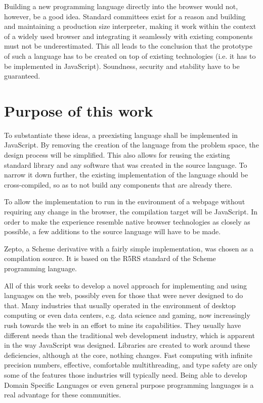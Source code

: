 \documentclass[oneside,11pt,xetex]{scrbook}
\begin{document}
Building a new programming language directly into the browser would not, however, be a good idea. Standard committees exist for a reason and building and maintaining a production size interpreter, making it work within the context of a widely used browser and integrating it seamlessly with existing components must not be underestimated. This all leads to the conclusion that the prototype of such a language has to be created on top of existing technologies (i.e. it has to be implemented in JavaScript). Soundness, security and stability have to be guaranteed.

\clearpage

\section*{Purpose of this work}
To substantiate these ideas, a preexisting language shall be implemented in JavaScript. By removing the creation of the language from the problem space, the design process will be simplified. This also allows for reusing the existing standard library and any software that was created in the source language. To narrow it down further, the existing implementation of the language should be cross-compiled, so as to not build any components that are already there.

To allow the implementation to run in the environment of a webpage without requiring any change in the browser, the compilation target will be JavaScript. In order to make the experience resemble native browser technologies as closely as possible, a few additions to the source language will have to be made.

Zepto, a Scheme derivative with a fairly simple implementation, was chosen as a compilation source. It is based on the R5RS standard of the Scheme programming language.

All of this work seeks to develop a novel approach for implementing and using languages on the web, possibly even for those that were never designed to do that. Many industries that usually operated in the environment of desktop computing or even data centers, e.g. data science and gaming, now increasingly rush towards the web in an effort to mine its capabilities. They usually have different needs than the traditional web development industry, which is apparent in the way JavaScript was designed. Libraries are created to work around these deficiencies, although at the core, nothing changes. Fast computing with infinite precision numbers, effective, comfortable multithreading, and type safety are only some of the features those industries will typically need. Being able to develop Domain Specific Languages or even general purpose programming languages is a real advantage for these communities.
\end{document}
